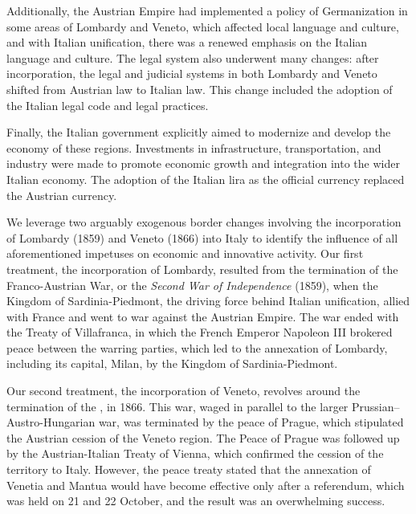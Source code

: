 Additionally, the Austrian Empire had implemented a policy of Germanization in some areas of Lombardy and Veneto, which affected local language and culture, and with Italian unification, there was a renewed emphasis on the Italian language and culture. The legal system also underwent many changes: after incorporation, the legal and judicial systems in both Lombardy and Veneto shifted from Austrian law to Italian law. This change included the adoption of the Italian legal code and legal practices.

Finally, the Italian government explicitly aimed to modernize and develop the economy of these regions. Investments in infrastructure, transportation, and industry were made to promote economic growth and integration into the wider Italian economy. The adoption of the Italian lira as the official currency replaced the Austrian currency.

We leverage two arguably exogenous border changes involving the incorporation of Lombardy (1859) and Veneto (1866) into Italy to identify the influence of all aforementioned impetuses on economic and innovative activity. Our first treatment, the incorporation of Lombardy, resulted from the termination of the Franco-Austrian War, or the \textit{Second War of Independence} (1859), when the Kingdom of Sardinia-Piedmont, the driving force behind Italian unification, allied with France and went to war against the Austrian Empire. The war ended with the Treaty of Villafranca, in which the French Emperor Napoleon III brokered peace between the warring parties, which led to the annexation of Lombardy, including its capital, Milan, by the Kingdom of Sardinia-Piedmont.

Our second treatment, the incorporation of Veneto, revolves around the termination of the , in 1866. This war, waged in parallel to the larger Prussian--Austro-Hungarian war, was terminated by the peace of Prague, which stipulated the Austrian cession of the Veneto region. The Peace of Prague was followed up by the Austrian-Italian Treaty of Vienna, which confirmed the cession of the territory to Italy. However, the peace treaty stated that the annexation of Venetia and Mantua would have become effective only after a referendum, which was held on 21 and 22 October, and the result was an overwhelming success. 


